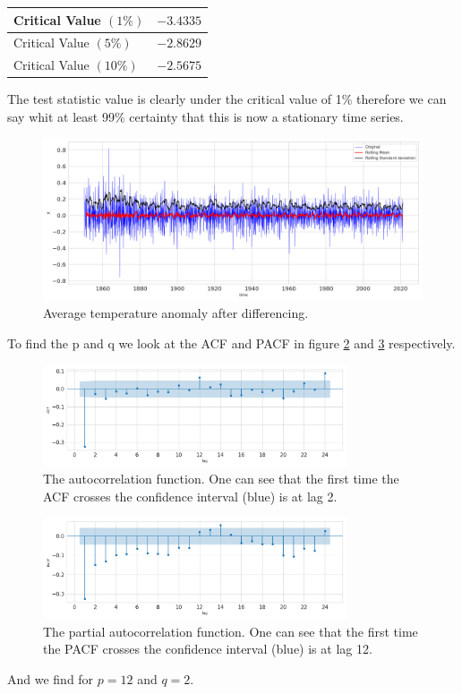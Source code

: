 \documentclass[]{article}
\begin{document}
\begin{itemize}
\begin{center}
\begin{tabular}{|l|r|}
				\hline Critical Value $(1 \%)$ & $-3.4335$ \\
				\hline Critical Value $(5 \%)$ & $-2.8629$ \\
				\hline Critical Value $(10 \%)$ & $-2.5675$ \\
				\hline
			\end{tabular}
		\end{center}
		The test statistic value is clearly under the critical value of 1\% therefore we can say whit at least 99\% certainty that this is now a stationary time series.
		\begin{figure}
			\centering
			\includegraphics[width=1\textwidth]{images/ts_moving_avg_diff_B.png}
			\caption{Average temperature anomaly after differencing.}
			\label{fig:rollingmean_diff_B}
		\end{figure}
		To find the p and q we look at the ACF and PACF in figure \ref{fig:acf_B} and \ref{fig:pacf_B} respectively.
		\begin{figure}
			\centering
			\includegraphics[width=0.8\textwidth]{images/autocorrelation_B.png}
			\caption{The autocorrelation function. One can see that the first time the ACF crosses the confidence interval (blue) is at lag 2.}
			\label{fig:acf_B}
		\end{figure}
		\begin{figure}
			\centering
			\includegraphics[width=0.8\textwidth]{images/partialautocorrelation_B.png}
			\caption{The partial autocorrelation function. One can see that the first time the PACF crosses the confidence interval (blue) is at lag 12.}
			\label{fig:pacf_B}
		\end{figure}
		And we find for $p=12$ and $q=2$.


\end{itemize}
\end{document}
